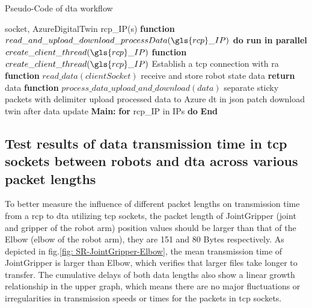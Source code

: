 \begin{breakablealgorithm}
    \caption{Pseudo-Code of \gls{dta} workflow}
    \label{alg:DTAgentPseudoCode}
    \begin{algorithmic}
     socket, AzureDigitalTwin
     \gls{rcp}\_IP(s)
    \State \textbf{function} {$read\_and\_upload\_download\_processData(\gls{rcp}\_IP)$}
        \State \qquad \textbf{do run in parallel}
            \State \qquad \qquad $create\_client\_thread(\gls{rcp}\_IP)$       
    \State \textbf{function} {$create\_client\_thread(\gls{rcp}\_IP)$}
        \State \qquad Establish a \gls{tcp} connection with \gls{ra}
        \State {}  
        \State {}    
    \State \textbf{function} {$read\_data(clientSocket)$}
        \State \qquad receive and store robot state data
        \State \qquad \textbf{return} data
    \State \textbf{function} {$process\_data\_upload\_and\_download(data)$}
        \State \qquad separate sticky packets with delimiter
        \State \qquad upload processed data to Azure \gls{dt} in json patch
        \State \qquad download twin after data update 
    \State \textbf{Main:}
        \State \qquad \textbf{for} \gls{rcp}\_IP in IPs \textbf{do}
        \State \qquad {}
        \State \textbf{End}
    \end{algorithmic}
\end{breakablealgorithm}


\subsection{Test results of data transmission 
time in \gls{tcp} sockets between robots and \gls{dta} across 
various packet lengths} \label{chap: Result-RCP-DTA}

To better measure the influence of different packet lengths on transmission time from 
a \gls{rcp} to \gls{dta} utilizing \gls{tcp} sockets, the packet length of JointGripper 
(joint and gripper of the robot arm) position values should be larger than that of the 
Elbow (elbow of the robot arm), they are 151 and 80 Bytes respectively. As depicted in 
fig.\ref{fig: SR-JointGripper-Elbow}, the mean transmission time of JointGripper is 
larger than Elbow, which verifies that larger files take longer to transfer. 
The cumulative delays of both data lengths also show a linear growth relationship in 
the upper graph, which means there are no major fluctuations or irregularities in 
transmission speeds or times for the packets in \gls{tcp} sockets. 


